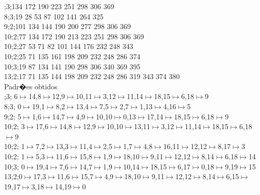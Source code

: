;3;134 172 190 223 251 298 306 369\\
8;3;19 28 53 87 102 141 264 325\\
9;2;101 134 144 190 200 277 298 306 369\\
10;2;77 134 172 190 213 223 251 298 306 369\\
10;2;27 53 71 82 101 144 176 232 248 343\\
10;2;25 71 135 161 198 209 232 248 286 374\\
10;3;19 87 134 141 190 298 306 340 369 395\\
13;2;17 71 135 144 198 209 232 248 286 319 343 374 380\\


	 Padr�es obtidos\\

;3; 6$\mapsto$14,8$\mapsto$12,9$\mapsto$10,11$\mapsto$3,12$\mapsto$11,14$\mapsto$18,15$\mapsto$6,18$\mapsto$9\\
8;3; 0$\mapsto$19,1$\mapsto$8,2$\mapsto$13,4$\mapsto$7,5$\mapsto$2,7$\mapsto$1,13$\mapsto$4,16$\mapsto$5\\
9;2; 5$\mapsto$1,6$\mapsto$14,7$\mapsto$4,9$\mapsto$10,10$\mapsto$0,13$\mapsto$17,14$\mapsto$18,15$\mapsto$6,18$\mapsto$9\\
10;2; 3$\mapsto$17,6$\mapsto$14,8$\mapsto$12,9$\mapsto$10,10$\mapsto$13,11$\mapsto$3,12$\mapsto$11,14$\mapsto$18,15$\mapsto$6,18$\mapsto$9\\
10;2; 1$\mapsto$7,2$\mapsto$13,3$\mapsto$11,4$\mapsto$2,5$\mapsto$1,7$\mapsto$4,8$\mapsto$16,11$\mapsto$12,12$\mapsto$8,17$\mapsto$3\\
10;2; 1$\mapsto$5,3$\mapsto$11,6$\mapsto$15,8$\mapsto$1,9$\mapsto$18,10$\mapsto$9,11$\mapsto$12,12$\mapsto$8,14$\mapsto$6,18$\mapsto$14\\
10;3; 0$\mapsto$19,4$\mapsto$7,6$\mapsto$14,7$\mapsto$1,9$\mapsto$10,14$\mapsto$18,15$\mapsto$6,17$\mapsto$0,18$\mapsto$9,19$\mapsto$15 \\
13;2;0$\mapsto$17,3$\mapsto$11,6$\mapsto$15,7$\mapsto$4,9$\mapsto$18,10$\mapsto$9,11$\mapsto$12,12$\mapsto$8,14$\mapsto$6,15$\mapsto$19,17$\mapsto$3,18$\mapsto$14,19$\mapsto$0\\
